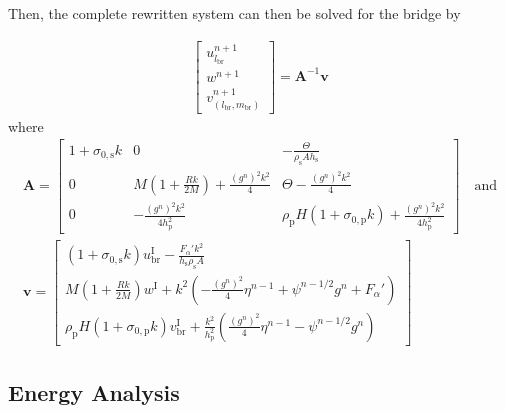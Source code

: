 \documentclass{article}
\begin{document}
Then, the complete rewritten system can then be solved for the bridge by

\begin{align}
\begin{bmatrix}
        u^{n+1}_{l_\text{br}}\\
        w^{n+1}\\
        v^{n+1}_{(l_\text{br}, m_\text{br})}
    \end{bmatrix}
    = 
    \mathbf{A}^{-1}\mathbf{v}
\end{align}
where
\begin{equation}
\begin{gathered}
\mathbf{A} = 
    \begin{bmatrix}
        1+\sigma_{0,\text{s}}k & 0 & - \frac{\Theta}{\rho_\text{s}Ah_\text{s}}\\
        0 & M(1+\frac{Rk}{2M}) + \frac{(g^n)^2k^2}{4} &\Theta-\frac{(g^n)^2k^2}{4}\\
        0 & -\frac{(g^n)^2k^2}{4h_\text{p}^2} & \rho_\text{p}H(1+\sigma_{0,\text{p}}k) + \frac{(g^n)^2k^2}{4h_\text{p}^2}
    \end{bmatrix}
    \quad \text{and}\\
    \mathbf{v} = 
    \begin{bmatrix}
        (1+\sigma_{0,\text{s}}k)u_\text{br}^\text{I} - \frac{F_\alpha'k^2}{h_\text{s}\rho_\text{s}A}\\
        M(1+\frac{Rk}{2M})w^\text{I}+k^2\left(-\frac{(g^n)^2}{4}\eta^{n-1}+\psi^{n-1/2}g^n + F_\alpha'\right)\\
        \rho_\text{p}H(1+\sigma_{0,\text{p}}k)v_\text{br}^\text{I}+\frac{k^2}{h_\text{p}^2}\left(\frac{(g^n)^2}{4}\eta^{n-1}-\psi^{n-1/2}g^n\right)
    \end{bmatrix}
    \nonumber
\end{gathered}
\end{equation}

\subsection{Energy Analysis}
\end{document}
